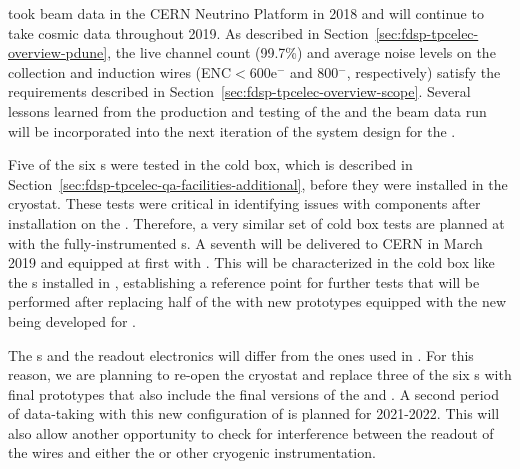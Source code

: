  took beam data in the CERN Neutrino Platform in 2018 and will continue
to take cosmic data throughout 2019. As described in Section~\ref{sec:fdsp-tpcelec-overview-pdune}, 
the live channel count (99.7\%) and average noise levels on the collection and induction wires 
(ENC$<$600e$^-$ and 800$^-$, respectively) satisfy the  requirements described 
in Section~\ref{sec:fdsp-tpcelec-overview-scope}. Several lessons learned from the production 
and testing of the  and the  beam data run will be incorporated into the 
next iteration of the system design for the .


Five of the six s were tested in the  cold box, which is described in
Section~\ref{sec:fdsp-tpcelec-qa-facilities-additional}, before they were installed in the cryostat. 
These tests were critical in identifying issues with  components after installation 
on the . Therefore, a very similar set of cold box tests are planned at  
with the fully-instrumented  s. A seventh  will be delivered
to CERN in March 2019 and equipped at first with  . This
 will be characterized in the cold box like the s installed
in , establishing a reference point for further tests that will be
performed after replacing half of the  with new prototypes equipped with the new  being developed for . 

The  s and the readout electronics will differ from the ones used 
in . For this reason, we are planning to re-open the  cryostat 
and replace three of the six s with final  prototypes that also include 
the final versions of the  and . A second period of data-taking 
with this new configuration of  is planned for 2021-2022. This will also 
allow another opportunity to check for interference between the readout of the  
wires and either the  or other cryogenic instrumentation.


